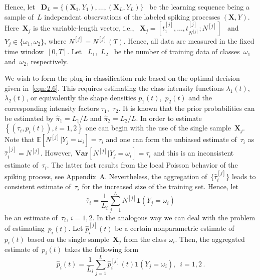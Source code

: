 \documentclass[lettersize,journal,onecolumn]{IEEEtran}
\theoremstyle{definition}
\newcommand{\E}[1]{\mathbb{E}\left[#1\right]}
\newcommand{\Var}[1]{\mathbf{Var}\left[#1\right]}
\begin{document}
Hence, let \mbox{
	$\mathbf{D}_{L}=\{(\mathbf{X}_{1},Y_{1}),\ldots,(\mathbf{X}_{L},Y_{L})\}$
} be the learning sequence being a sample of~$L$ independent observations of the 
labeled spiking processes $(\mathbf{X},Y)$. 
Here~$\mathbf{X}_{j}$ is the variable-length vector, i.e., \mbox{
	$\mathbf{X}_{j}=\left[t_{1}^{[j]},\ldots,t_{N^{[j]}}^{[j]};N^{[j]}\right]$
} and \mbox{$Y_{j}\in \{\omega_{1},\omega_{2}\}$}, where \mbox{$N^{[j]}=N^{[j]}(T)$}. 
Hence, all data are measured in the fixed time window~$[0,T]$. Let \mbox{
	$L_{1}$, $L_{2}$
} be the number of training data of classes~$\omega_{1}$ and~$\omega_{2}$, 
respectively. 

We wish to form the plug-in classification rule based on the optimal 
decision given in~\eqref{eqn:2.6}. This requires estimating the class intensity 
functions \mbox{$\lambda_{1}(t)$, $\lambda_{2}(t)$}, or equivalently the shape 
densities \mbox{$p_{1}(t)$, $p_{2}(t)$} and the corresponding intensity factors 
\mbox{$\tau_{1}$, $\tau_{2}$}. It is known that the prior probabilities can be 
estimated by \mbox{$\widehat{\pi}_{1}=L_{1}/L$} and 
\mbox{$\widehat{\pi}_{2}=L_{2}/L$}. In order to estimate \mbox{$
	\left\{\left(\tau_{i},p_{i}(t)\right), i=1,2\right\}
	$} one can begin with the use of the single 
sample~$\mathbf{X}_{j}$. Note that 
\mbox{$\E{N^{[j]}|Y_j=\omega_{i}}=\tau_{i}$} and one can form the 
unbiased estimate of~$\tau_{i}$ as \mbox{$\widehat{\tau}_{i}^{[j]}=N^{[j]}$}. However, 
\mbox{$\Var{N^{[j]}|Y_j=\omega_{i}}=\tau_{i}$} and this is an 
inconsistent estimate of~$\tau_{i}$. The latter fact results from the local Poisson 
behavior of the spiking process, see Appendix~A. Nevertheless, the aggregation
of~$\{\widehat{\tau}_{i}^{[j]}\}$ leads to consistent estimate of~$\tau_{i}$ for the 
increased size of the training set. Hence, let 
\begin{equation}
	\widehat{\tau}_{i}=
	\frac{1}{L_{i}}\sum_{j=1}^{L}N^{[j]}\mathbf{1}(Y_{j}=\omega_{i})
	\label{eqn:4.1}
\end{equation}
be an estimate of~$\tau_{i}$, \enspace$i=1,2$. 
In the analogous way we can deal with the problem of estimating~$p_{i}(t)$. Let 
\mbox{$\widehat{p}_{i}^{[j]}(t)$} be a certain nonparametric estimate 
of~$p_{i}(t)$ based on the single sample~$\mathbf{X}_{j}$ from the class $\omega_{i}$. 
Then, the aggregated estimate of~$p_{i}(t)$ takes the following form 
\begin{equation}
	\widehat{p}_{i}(t)=
	\frac{1}{L_{i}}\sum_{j=1}^{L}\widehat{p}_{i}^{[j]}(t)\mathbf{1}(Y_{j}=
	\omega_{i}) ,
	\enspace i=1,2
	\label{eqn:4.2} \,.
\end{equation}
\end{document}
